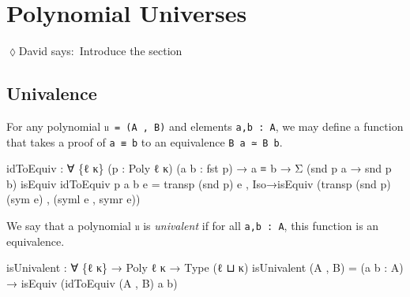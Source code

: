 \documentclass[
  11pt,
  oneside,
  article]{memoir}
\newenvironment{Shaded}{}{}
\newcommand{\NormalTok}[1]{#1}
\newcommand{\OtherTok}[1]{\textcolor[rgb]{0.00,0.44,0.13}{#1}}
\theoremstyle{definition}
\theoremstyle{plain}
\newcommand{\0}{\textsf{0}}
\newcommand{\1}{\tn{\textsf{1}}}
\newcommand{\dnote}[1]{{\quad \color{blue}$\lozenge$\;David says:}~#1\;{\color{blue}$\lozenge$}\quad}
\begin{document}
\chapter{Polynomial Universes}\label{polynomial-universes}

\dnote{Introduce the section}

\section{Univalence}\label{univalence}

For any polynomial \texttt{𝔲\ =\ (A\ ,\ B)} and elements
\texttt{a,b\ :\ A}, we may define a function that takes a proof of
\texttt{a\ ≡\ b} to an equivalence \texttt{B\ a\ ≃\ B\ b}.

\begin{Shaded}
\begin{Highlighting}[]
\NormalTok{idToEquiv }\OtherTok{:} \OtherTok{∀} \OtherTok{\{}\NormalTok{ℓ κ}\OtherTok{\}} \OtherTok{(}\NormalTok{p }\OtherTok{:}\NormalTok{ Poly ℓ κ}\OtherTok{)} \OtherTok{(}\NormalTok{a b }\OtherTok{:}\NormalTok{ fst p}\OtherTok{)}
            \OtherTok{→}\NormalTok{ a ≡ b }\OtherTok{→}\NormalTok{ Σ }\OtherTok{(}\NormalTok{snd p a }\OtherTok{→}\NormalTok{ snd p b}\OtherTok{)}\NormalTok{ isEquiv}
\NormalTok{idToEquiv p a b e }\OtherTok{=} 
\NormalTok{      transp }\OtherTok{(}\NormalTok{snd p}\OtherTok{)}\NormalTok{ e}
\NormalTok{    , Iso→isEquiv }\OtherTok{(}\NormalTok{transp }\OtherTok{(}\NormalTok{snd p}\OtherTok{)} \OtherTok{(}\NormalTok{sym e}\OtherTok{)}\NormalTok{ , }\OtherTok{(}\NormalTok{syml e , symr e}\OtherTok{))}
\end{Highlighting}
\end{Shaded}

We say that a polynomial \texttt{𝔲} is \emph{univalent} if for all
\texttt{a,b\ :\ A}, this function is an equivalence.

\begin{Shaded}
\begin{Highlighting}[]
\NormalTok{isUnivalent }\OtherTok{:} \OtherTok{∀} \OtherTok{\{}\NormalTok{ℓ κ}\OtherTok{\}} \OtherTok{→}\NormalTok{ Poly ℓ κ }\OtherTok{→}\NormalTok{ Type }\OtherTok{(}\NormalTok{ℓ ⊔ κ}\OtherTok{)}
\NormalTok{isUnivalent }\OtherTok{(}\NormalTok{A , B}\OtherTok{)} \OtherTok{=} 
    \OtherTok{(}\NormalTok{a b }\OtherTok{:}\NormalTok{ A}\OtherTok{)} \OtherTok{→}\NormalTok{ isEquiv }\OtherTok{(}\NormalTok{idToEquiv }\OtherTok{(}\NormalTok{A , B}\OtherTok{)}\NormalTok{ a b}\OtherTok{)}
\end{Highlighting}
\end{Shaded}
\end{document}
